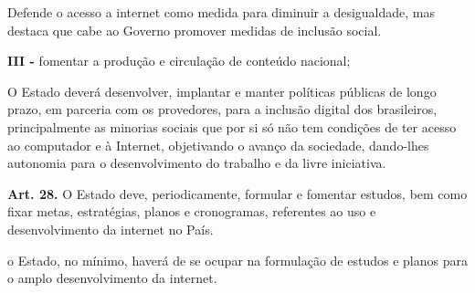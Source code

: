 \begin{displayquote}      
    Defende o acesso a internet como medida para diminuir a desigualdade, mas destaca que cabe ao Governo promover medidas de inclusão social.
\end{displayquote}   

\noindent\textbf{III -} fomentar a produção e circulação de conteúdo nacional;

\begin{displayquote}    
    O Estado deverá desenvolver, implantar e manter políticas públicas de longo prazo, em
    parceria com os provedores, para a inclusão digital dos brasileiros, principalmente as
    minorias sociais que por si só não tem condições de ter acesso ao computador e à
    Internet, objetivando o avanço da sociedade, dando-lhes autonomia para o
    desenvolvimento do trabalho e da livre iniciativa.  
\end{displayquote}   


\noindent\textbf{Art. 28.} O Estado deve, periodicamente, formular e fomentar estudos, bem como fixar metas,
estratégias, planos e cronogramas, referentes ao uso e desenvolvimento da internet no País.

\begin{displayquote}  
    o Estado, no mínimo, haverá de se ocupar na formulação de estudos e planos para o amplo desenvolvimento da internet.
\end{displayquote}  